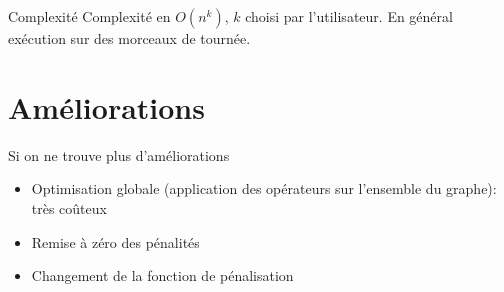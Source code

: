 \documentclass{beamer}
\begin{document}
\begin{frame}
\begin{alertblock}{Complexité}
Complexité en $O(n^k)$, $k$ choisi par l'utilisateur. En général exécution sur des morceaux de tournée.
\end{alertblock}

\begin{center}

\end{center}

\end{frame}


\section{Améliorations}
\begin{frame}
Si on ne trouve plus d'améliorations
\begin{itemize}
\item Optimisation globale (application des opérateurs sur l'ensemble du graphe): très coûteux
\item Remise à zéro des pénalités
\item Changement de la fonction de pénalisation

\end{itemize}

\end{frame}
\end{document}
